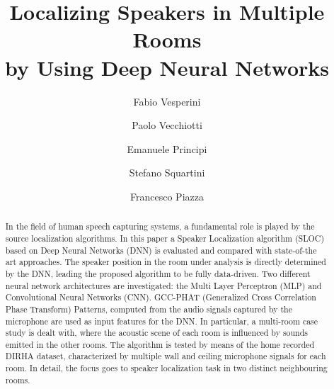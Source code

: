 \documentclass[review]{elsarticle}
\begin{document}
\begin{frontmatter}






\title{Localizing Speakers in Multiple Rooms \\ by Using Deep Neural Networks}

\author{Fabio Vesperini}
\author{Paolo Vecchiotti} 
\author{Emanuele Principi} 
\author{Stefano Squartini} 
\author{Francesco Piazza} 
\address{Department of Information Engineering, Universit\`a Politecnica delle Marche, Via Brecce Bianche, 60131, Ancona, Italy}

\begin{abstract}
In the field of human speech capturing systems, a fundamental role is played by the source localization algorithms. In this paper a Speaker Localization algorithm (SLOC) based on Deep Neural Networks (DNN) is evaluated and compared with state-of-the art approaches. The speaker position in the room under analysis is directly determined by the DNN, leading the proposed algorithm to be fully data-driven. Two different neural network architectures are investigated: the Multi Layer Perceptron (MLP) and Convolutional Neural Networks (CNN). GCC-PHAT (Generalized Cross Correlation Phase Transform) Patterns, computed from the audio signals captured by the microphone  are used as input features for the DNN.  
In particular, a multi-room case study is dealt with, where the acoustic scene of each room is influenced by sounds emitted in the other rooms.
The algorithm is tested by means of the home recorded DIRHA dataset, characterized by multiple wall and ceiling microphone signals for each room. In detail, the focus goes to speaker localization task in two distinct neighbouring rooms.%


\end{abstract}
\end{frontmatter}
\end{document}
